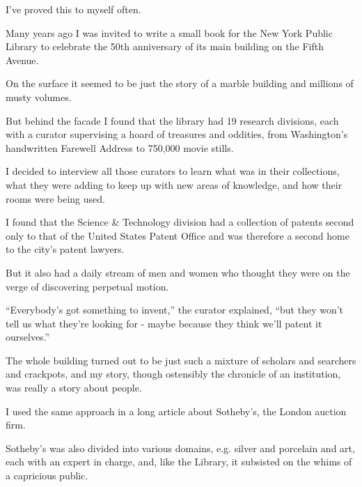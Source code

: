 \documentclass{book}
\numberwithin{equation}{section}
\begin{document}
%
I've proved this to myself often.

Many years ago I was invited to write a small book for the New York Public Library to celebrate the 50th anniversary of its main building on the Fifth Avenue.

On the surface it seemed to be just the story of a marble building and millions of musty volumes.

But behind the facade I found that the library had 19 research divisions, each with a curator supervising a hoard of treasures and oddities, from Washington's handwritten Farewell Address to 750,000 movie stills.

I decided to interview all those curators to learn what was in their collections, what they were adding to keep up with new areas of knowledge, and how their rooms were being used.

%
I found that the Science \& Technology division had a collection of patents second only to that of the United States Patent Office and was therefore a second home to the city's patent lawyers.

But it also had a daily stream of men and women who thought they were on the verge of discovering perpetual motion.

``Everybody's got something to invent,'' the curator explained, ``but they won't tell us what they're looking for - maybe because they think we'll patent it ourselves.''

The whole building turned out to be just such a mixture of scholars and searchers and crackpots, and my story, though ostensibly the chronicle of an institution, was really a story about people.

I used the same approach in a long article about Sotheby's, the London auction firm.

Sotheby's was also divided into various domains, e.g. silver and porcelain and art, each with an expert in charge, and, like the Library, it subsisted on the whims of a capricious public.
\end{document}
